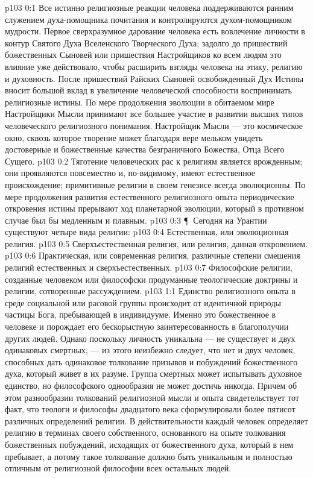 \author{Мелхиседек}
\vs p103 0:1 Все истинно религиозные реакции человека поддерживаются ранним служением духа\hyp{}помощника почитания и контролируются духом\hyp{}помощником мудрости. Первое сверхразумное дарование человека есть вовлечение личности в контур Святого Духа Вселенского Творческого Духа; задолго до пришествий божественных Сыновей или пришествия Настройщиков ко всем людям это влияние уже действовало, чтобы расширить взгляды человека на этику, религию и духовность. После пришествий Райских Сыновей освобожденный Дух Истины вносит большой вклад в увеличение человеческой способности воспринимать религиозные истины. По мере продолжения эволюции в обитаемом мире Настройщики Мысли принимают все большее участие в развитии высших типов человеческого религиозного понимания. Настройщик Мысли --- это космическое окно, сквозь которое творение может благодаря вере мельком увидеть достоверные и божественные качества безграничного Божества, Отца Всего Сущего.
\vs p103 0:2 Тяготение человеческих рас к религиям является врожденным; они проявляются повсеместно и, по\hyp{}видимому, имеют естественное происхождение; примитивные религии в своем генезисе всегда эволюционны. По мере продолжения развития естественного религиозного опыта периодические откровения истины прерывают ход планетарной эволюции, который в противном случае был бы медленным и плавным.
\vs p103 0:3 \P\ Сегодня на Урантии существуют четыре вида религии:
\vs p103 0:4 \bibnobreakspace Естественная, или эволюционная религия.
\vs p103 0:5 \bibnobreakspace Сверхъестественная религия, или религия, данная откровением.
\vs p103 0:6 \bibnobreakspace Практическая, или современная религия, различные степени смешения религий естественных и сверхъестественных.
\vs p103 0:7 \bibnobreakspace Философские религии, созданные человеком или философски продуманные теологические доктрины и религии, сотворенные рассуждением.
\vs p103 1:1 Единство религиозного опыта в среде социальной или расовой группы происходит от идентичной природы частицы Бога, пребывающей в индивидууме. Именно это божественное в человеке и порождает его бескорыстную заинтересованность в благополучии других людей. Однако поскольку личность уникальна --- не существует и двух одинаковых смертных, --- из этого неизбежно следует, что нет и двух человек, способных дать одинаковое толкование призывов и побуждений божественного духа, который живет в их разуме. Группа смертных может испытывать духовное единство, но философского однообразия не может достичь никогда. Причем об этом разнообразии толкований религиозной мысли и опыта свидетельствует тот факт, что теологи и философы двадцатого века сформулировали более пятисот различных определений религии. В действительности каждый человек определяет религию в терминах своего собственного, основанного на опыте толкования божественных побуждений, исходящих от божественного духа, который в нем пребывает, а потому такое толкование должно быть уникальным и полностью отличным от религиозной философии всех остальных людей.
